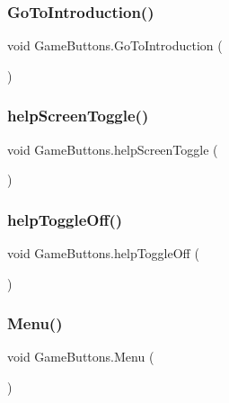 \subsubsection{\texorpdfstring{Go\+To\+Introduction()}{GoToIntroduction()}}
{\footnotesize\ttfamily void Game\+Buttons.\+Go\+To\+Introduction (\begin{DoxyParamCaption}{ }\end{DoxyParamCaption})}

\mbox{\label{class_game_buttons_a1ca7b15fb784ed277bc107613d95606d}} 
\subsubsection{\texorpdfstring{help\+Screen\+Toggle()}{helpScreenToggle()}}
{\footnotesize\ttfamily void Game\+Buttons.\+help\+Screen\+Toggle (\begin{DoxyParamCaption}{ }\end{DoxyParamCaption})}

\mbox{\label{class_game_buttons_a2a81335687a2eb013f83fccf7394f57d}} 
\subsubsection{\texorpdfstring{help\+Toggle\+Off()}{helpToggleOff()}}
{\footnotesize\ttfamily void Game\+Buttons.\+help\+Toggle\+Off (\begin{DoxyParamCaption}{ }\end{DoxyParamCaption})}

\mbox{\label{class_game_buttons_a64856a3c989ce3d14db961766db49425}} 
\subsubsection{\texorpdfstring{Menu()}{Menu()}}
{\footnotesize\ttfamily void Game\+Buttons.\+Menu (\begin{DoxyParamCaption}{ }\end{DoxyParamCaption})}

